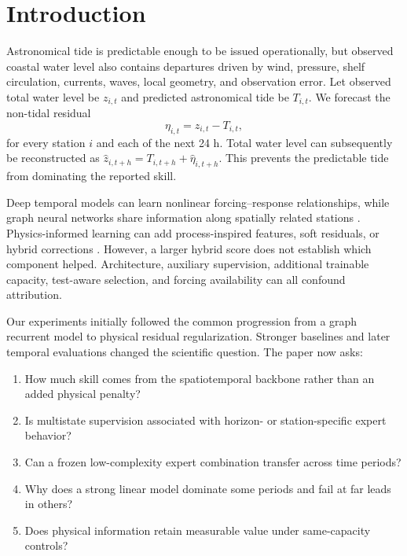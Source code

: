 \documentclass[final,5p,times,twocolumn]{elsarticle}
\begin{document}
\section{Introduction}
Astronomical tide is predictable enough to be issued operationally, but observed coastal water level also contains departures driven by wind, pressure, shelf circulation, currents, waves, local geometry, and observation error. Let observed total water level be $z_{i,t}$ and predicted astronomical tide be $T_{i,t}$. We forecast the non-tidal residual
\begin{equation}
\eta_{i,t}=z_{i,t}-T_{i,t},
\label{eq:residual}
\end{equation}
for every station $i$ and each of the next 24 h. Total water level can subsequently be reconstructed as $\hat z_{i,t+h}=T_{i,t+h}+\hat\eta_{i,t+h}$. This prevents the predictable tide from dominating the reported skill.

Deep temporal models can learn nonlinear forcing--response relationships, while graph neural networks share information along spatially related stations \citep{kipf2017gcn,li2018dcrnn,wu2019graphwavenet}. Physics-informed learning can add process-inspired features, soft residuals, or hybrid corrections \citep{raissi2019pinn,karniadakis2021piml}. However, a larger hybrid score does not establish which component helped. Architecture, auxiliary supervision, additional trainable capacity, test-aware selection, and forcing availability can all confound attribution.

Our experiments initially followed the common progression from a graph recurrent model to physical residual regularization. Stronger baselines and later temporal evaluations changed the scientific question. The paper now asks:
\begin{enumerate}[leftmargin=*,itemsep=1pt]
\item How much skill comes from the spatiotemporal backbone rather than an added physical penalty?
\item Is multistate supervision associated with horizon- or station-specific expert behavior?
\item Can a frozen low-complexity expert combination transfer across time periods?
\item Why does a strong linear model dominate some periods and fail at far leads in others?
\item Does physical information retain measurable value under same-capacity controls?
\end{enumerate}
\end{document}
